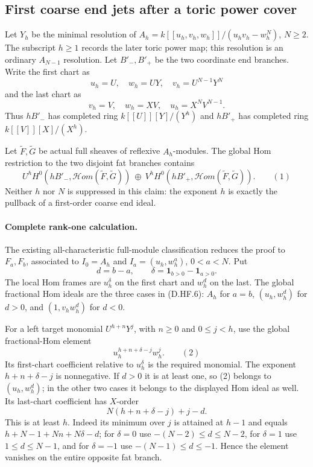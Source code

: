 \subsection*{First coarse end jets after a toric power cover}

Let $Y_h$ be the minimal resolution of
$A_h=k[[u_h,v_h,w_h]]/(u_hv_h-w_h^N)$, $N\ge2$.
The subscript $h\ge1$ records the later toric power map; this resolution
is an ordinary $A_{N-1}$ resolution. Let $B'_-,B'_+$ be the two coordinate
end branches. Write the first chart as
\[
 u_h=U,\quad w_h=UY,\quad v_h=U^{N-1}Y^N
\]
and the last chart as
\[
 v_h=V,\quad w_h=XV,\quad u_h=X^NV^{N-1}.
\]
Thus $hB'_-$ has completed ring $k[[U]][Y]/(Y^h)$ and $hB'_+$ has
completed ring $k[[V]][X]/(X^h)$.

Let $\widetilde F,\widetilde G$ be actual full sheaves of reflexive
$A_h$-modules. The global Hom restriction to the two disjoint fat branches
contains
\[
 U^h H^0(hB'_-,\mathcal Hom(\widetilde F,\widetilde G))
 \ \oplus\ 
 V^h H^0(hB'_+,\mathcal Hom(\widetilde F,\widetilde G)).       \qquad(1)
\]
Neither $h$ nor $N$ is suppressed in this claim: the exponent $h$ is
exactly the pullback of a first-order coarse end ideal.

\paragraph{Complete rank-one calculation.}
The existing all-characteristic full-module classification reduces the
proof to $F_a,F_b$, associated to $I_0=A_h$ and
$I_a=(u_h,w_h^a)$, $0<a<N$. Put
\[
 d=b-a,\qquad \delta=\mathbf1_{b>0}-\mathbf1_{a>0}.
\]
The local Hom frames are $u_h^\delta$ on the first chart and $w_h^d$ on
the last. The global fractional Hom ideals are the three cases in
(D.HF.6): $A_h$ for $a=b$, $(u_h,w_h^d)$ for $d>0$, and
$(1,v_hw_h^d)$ for $d<0$.

For a left target monomial $U^{h+n}Y^j$, with $n\ge0$ and $0\le j<h$,
use the global fractional-Hom element
\[
                       u_h^{h+n+\delta-j}w_h^j.         \qquad(2)
\]
Its first-chart coefficient relative to $u_h^\delta$ is the required
monomial. The exponent $h+n+\delta-j$ is nonnegative. If $d>0$ it is
at least one, so (2) belongs to $(u_h,w_h^d)$; in the other two cases it
belongs to the displayed Hom ideal as well. Its last-chart coefficient
has $X$-order
\[
                  N(h+n+\delta-j)+j-d.
\]
This is at least $h$. Indeed its minimum over $j$ is attained at $h-1$
and equals $h+N-1+Nn+N\delta-d$; for $\delta=0$ use
$-(N-2)\le d\le N-2$, for $\delta=1$ use $1\le d\le N-1$, and for
$\delta=-1$ use $-(N-1)\le d\le-1$. Hence the element vanishes on
the entire opposite fat branch.

